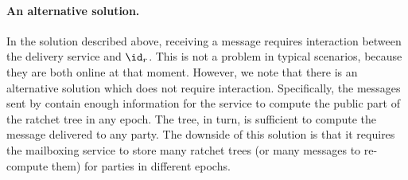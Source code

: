\paragraph{An alternative solution.}
In the solution described above, receiving a message requires interaction between the delivery service and $\id_r$. This
is not a problem in typical scenarios, because they are both online at that moment. However, we note that there is an
alternative solution which does not require interaction. Specifically, the messages sent by \saik contain enough
information for the service to compute the public part of the ratchet tree in any epoch. The tree, in turn, is sufficient to compute the message delivered to any party.
The downside of this solution is that it requires the mailboxing service to store many ratchet trees (or many messages to re-compute them) for parties in different epochs.

